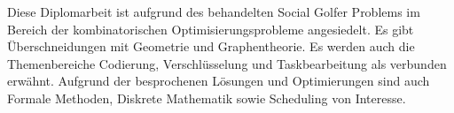 
Diese Diplomarbeit ist aufgrund des behandelten Social Golfer Problems im Bereich der kombinatorischen Optimisierungsprobleme angesiedelt. Es gibt Überschneidungen mit Geometrie und Graphentheorie. Es werden auch die Themenbereiche Codierung, Verschlüsselung und Taskbearbeitung als verbunden erwähnt. Aufgrund der besprochenen Lösungen und Optimierungen sind auch Formale Methoden, Diskrete Mathematik sowie Scheduling von Interesse.






